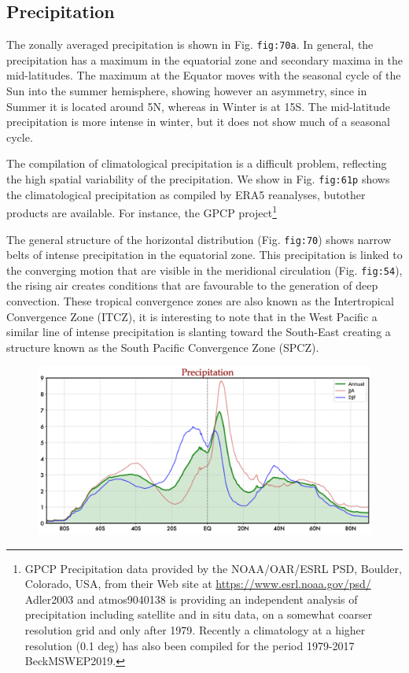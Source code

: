 \subsection{Precipitation}\label{precipitation}

The zonally averaged precipitation is shown in Fig. \texttt{fig:70a}. In
general, the precipitation has a maximum in the equatorial zone and
secondary maxima in the mid-latitudes. The maximum at the Equator moves
with the seasonal cycle of the Sun into the summer hemisphere, showing
however an asymmetry, since in Summer it is located around 5N, whereas
in Winter is at 15S. The mid-latitude precipitation is more intense in
winter, but it does not show much of a seasonal cycle.

The compilation of climatological precipitation is a difficult problem,
reflecting the high spatial variability of the precipitation. We show in
Fig. \texttt{fig:61p} shows the climatological precipitation as compiled
by ERA5 reanalyses, butother products are available. For instance, the
GPCP project\footnote{GPCP Precipitation data provided by the
  NOAA/OAR/ESRL PSD, Boulder, Colorado, USA, from their Web site at
  \url{https://www.esrl.noaa.gov/psd/} Adler2003 and atmos9040138 is
providing an independent analysis of precipitation including satellite
and in situ data, on a somewhat coarser resolution grid and only after
1979. Recently a climatology at a higher resolution (0.1 deg) has also
been compiled for the period 1979-2017 BeckMSWEP2019.}

The general structure of the horizontal distribution (Fig.
\texttt{fig:70}) shows narrow belts of intense precipitation in the
equatorial zone. This precipitation is linked to the converging motion
that are visible in the meridional circulation (Fig. \texttt{fig:54}),
the rising air creates conditions that are favourable to the generation
of deep convection. These tropical convergence zones are also known as
the Intertropical Convergence Zone (ITCZ), it is interesting to note
that in the West Pacific a similar line of intense precipitation is
slanting toward the South-East creating a structure known as the South
Pacific Convergence Zone (SPCZ).

\begin{figure}
\centering
\includegraphics[width = .7 \textwidth]{figs/GD/PrecALLJJA.png}
\caption{} \label{fig:}
\end{figure}

